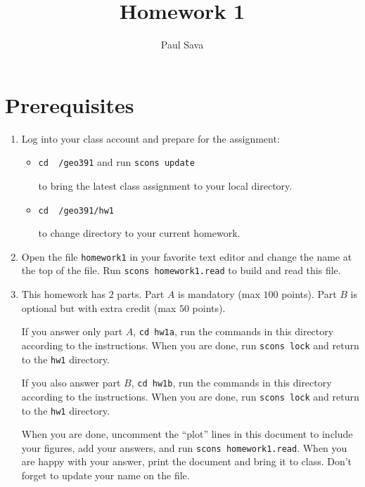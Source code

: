 \author{Paul Sava}
\title{Homework 1}




\section{Prerequisites}

\begin{enumerate}
\item Log into your class account and prepare for the assignment:

\begin{itemize}
\item \texttt{cd ~/geo391} and run \texttt{scons update} \par
to bring the latest class assignment to your local directory.
\item \texttt{cd ~/geo391/hw1} \par
to change directory to your current homework.
\end{itemize}

\item Open the file \texttt{homework1} in your favorite text editor
and change the name at the top of the file.
Run \texttt{scons homework1.read} to build and read this file.

\item This homework has $2$ parts. 
Part $A$ is mandatory (max $100$ points).
Part $B$ is optional but with extra credit (max $50$ points).

If you answer only part $A$, \texttt{cd hw1a},
run the commands in this directory according to the 
instructions. When you are done, run \texttt{scons lock} and
return to the \texttt{hw1} directory.

If you also answer part $B$, \texttt{cd hw1b},
run the commands in this directory according to the 
instructions. When you are done, run \texttt{scons lock} and
return to the \texttt{hw1} directory.

When you are done, uncomment the ``plot'' lines in this document
to include your figures, add your answers, and run
\texttt{scons homework1.read}. 
When you are happy with your answer, print the document and
bring it to class. Don't forget to update your name on the file.

\end{enumerate}



